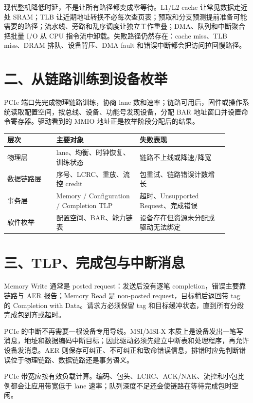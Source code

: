 现代整机降低时延，不是让所有路径都变成零等待。L1/L2 cache 让常见数据走近处 SRAM；TLB 让近期地址转换不必每次查页表；预取和分支预测提前准备可能需要的路径；流水线、旁路和乱序调度让独立工作重叠；DMA、队列和中断聚合把批量 I/O 从 CPU 指令流中卸载。失败路径仍然存在：cache miss、TLB miss、DRAM 排队、设备背压、DMA fault 和错误中断都会把访问拉回慢路径。

\section{二、从链路训练到设备枚举}

PCIe 端口先完成物理链路训练，协商 lane 数和速率；链路可用后，固件或操作系统读取配置空间，按总线、设备、功能号发现设备，分配 BAR 地址窗口并设置命令寄存器。驱动看到的 MMIO 地址正是枚举阶段分配后的结果。

\begin{longtable}{L{0.2\linewidth}L{0.34\linewidth}L{0.36\linewidth}}
\toprule
层次 & 主要对象 & 失败表现 \\
\midrule
物理层 & lane、均衡、时钟恢复、训练状态 & 链路不上线或降速/降宽 \\\tablerowrule
数据链路层 & 序号、LCRC、重放、流控 credit & 包重试、链路错误计数增长 \\\tablerowrule
事务层 & Memory / Configuration / Completion TLP & 超时、Unsupported Request、完成错误 \\\tablerowrule
软件枚举 & 配置空间、BAR、能力链表 & 设备存在但资源未分配或驱动无法绑定 \\
\bottomrule
\end{longtable}

\section{三、TLP、完成包与中断消息}

Memory Write 通常是 posted request：发送后没有逐笔 completion，错误主要靠链路与 AER 报告；Memory Read 是 non-posted request，目标稍后返回带 tag 的 Completion with Data。请求方必须保留 tag 和目标缓冲状态，直到所有分段完成包到齐或超时。

PCIe 的中断不再需要一根设备专用导线。MSI/MSI-X 本质上是设备发出一笔写消息，地址和数据编码中断目标；因此驱动必须先建立中断表和处理程序，再允许设备发消息。AER 则保存可纠正、不可纠正和致命错误信息，排错时应先判断错误位于物理链路、数据链路还是事务语义。

\begin{classicnote}
PCIe 带宽应按有效负载计算。编码、包头、LCRC、ACK/NAK、流控和小包比例都会让应用带宽低于 lane 速率；队列深度不足还会使链路在等待完成包时空闲。
\end{classicnote}

